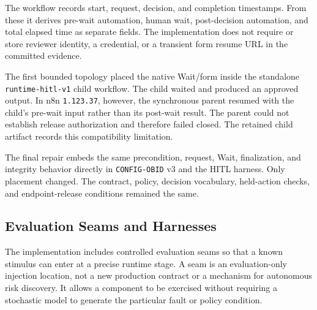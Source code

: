 The workflow records start, request, decision, and completion timestamps.
From these it derives pre-wait automation, human wait, post-decision
automation, and total elapsed time as separate fields. The implementation
does not require or store reviewer identity, a credential, or a transient form
resume URL in the committed evidence.

The first bounded topology placed the native Wait/form inside the standalone
\texttt{runtime-hitl-v1} child workflow. The child waited and produced an
approved output. In n8n \texttt{1.123.37}, however, the synchronous parent
resumed with the child's pre-wait input rather than its post-wait result. The
parent could not establish release authorization and therefore failed closed.
The retained child artifact records this compatibility limitation.

The final repair embeds the same precondition, request, Wait, finalization,
and integrity behavior directly in \texttt{CONFIG-OBID} v3 and the HITL
harness. Only placement changed. The contract, policy, decision vocabulary,
held-action checks, and endpoint-release conditions remained the same.

\subsection{Evaluation Seams and Harnesses}\label{subsec:impl-seams}

The implementation includes controlled evaluation seams so that a known
stimulus can enter at a precise runtime stage. A seam is an evaluation-only
injection location, not a new production contract or a mechanism for
autonomous risk discovery. It allows a component to be exercised without
requiring a stochastic model to generate the particular fault or policy
condition.

